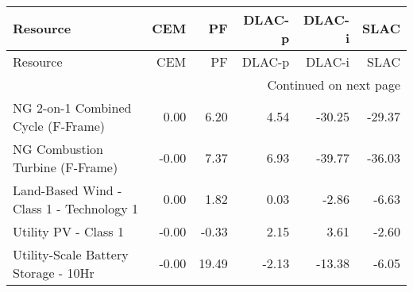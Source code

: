 \documentclass{article}
\begin{document}
\hline
{} \\
\hline
\begin{longtable}{lrrrrr}
\toprule
Resource & CEM & PF & DLAC-p & DLAC-i & SLAC \\
\midrule
\endfirsthead
\toprule
Resource & CEM & PF & DLAC-p & DLAC-i & SLAC \\
\midrule
\endhead
\midrule
\multicolumn{6}{r}{Continued on next page} \\
\midrule
\endfoot
\bottomrule
\endlastfoot
NG 2-on-1 Combined Cycle (F-Frame) & 0.00 & 6.20 & 4.54 & -30.25 & -29.37 \\
NG Combustion Turbine (F-Frame) & -0.00 & 7.37 & 6.93 & -39.77 & -36.03 \\
Land-Based Wind - Class 1 - Technology 1 & 0.00 & 1.82 & 0.03 & -2.86 & -6.63 \\
Utility PV - Class 1 & -0.00 & -0.33 & 2.15 & 3.61 & -2.60 \\
Utility-Scale Battery Storage - 10Hr & -0.00 & 19.49 & -2.13 & -13.38 & -6.05 \\
\end{longtable}
\end{document}
